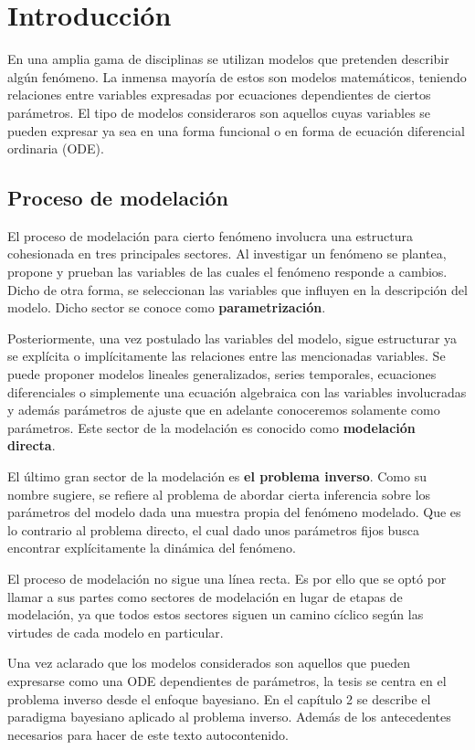 \chapter{Introducción}

En una amplia gama de disciplinas se utilizan modelos que pretenden describir algún fenómeno. La inmensa mayoría de estos son modelos matemáticos, teniendo relaciones entre variables expresadas por ecuaciones dependientes de ciertos parámetros. El tipo de modelos consideraros son aquellos cuyas variables se pueden expresar ya sea en una forma funcional o en forma de ecuación diferencial ordinaria (ODE).

\section{Proceso de modelación}

El proceso de modelación para cierto fenómeno involucra una estructura cohesionada en tres principales sectores. Al investigar un fenómeno se plantea, propone y prueban las variables de las cuales el fenómeno responde a cambios. Dicho de otra forma, se seleccionan las variables que influyen en la descripción del modelo. Dicho sector se conoce como \textbf{parametrización}. 

Posteriormente, una vez postulado las variables del modelo, sigue estructurar ya se explícita o implícitamente las relaciones entre las mencionadas variables. Se puede proponer modelos lineales generalizados, series temporales, ecuaciones diferenciales o simplemente una ecuación algebraica con las variables involucradas y además parámetros de ajuste que en adelante conoceremos solamente como parámetros. Este sector de la modelación es conocido como \textbf{modelación directa}. 

El último gran sector de la modelación es \textbf{el problema inverso}. Como su nombre sugiere, se refiere al problema de abordar cierta inferencia sobre los parámetros del modelo dada una muestra propia del fenómeno modelado. Que es lo contrario al problema directo, el cual dado unos parámetros fijos busca encontrar explícitamente la dinámica del fenómeno. 

El proceso de modelación no sigue una línea recta. Es por ello que se optó por llamar a sus partes como sectores de modelación en lugar de etapas de modelación, ya que todos estos sectores siguen un camino cíclico según las virtudes de cada modelo en particular. 

Una vez aclarado que los modelos considerados son aquellos que pueden expresarse como una ODE dependientes de parámetros, la tesis se centra en el problema inverso desde el enfoque bayesiano. En el capítulo 2 se describe el paradigma bayesiano aplicado al problema inverso. Además de los antecedentes necesarios para hacer de este texto autocontenido. 

